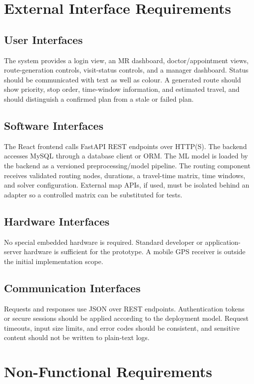 \documentclass[12pt,a4paper,oneside]{report}
\begin{document}
\section{External Interface Requirements}
\subsection{User Interfaces}
The system provides a login view, an MR dashboard, doctor/appointment views, route-generation controls, visit-status controls, and a manager dashboard. Status should be communicated with text as well as colour. A generated route should show priority, stop order, time-window information, and estimated travel, and should distinguish a confirmed plan from a stale or failed plan.

\subsection{Software Interfaces}
The React frontend calls FastAPI REST endpoints over HTTP(S). The backend accesses MySQL through a database client or ORM. The ML model is loaded by the backend as a versioned preprocessing/model pipeline. The routing component receives validated routing nodes, durations, a travel-time matrix, time windows, and solver configuration. External map APIs, if used, must be isolated behind an adapter so a controlled matrix can be substituted for tests.

\subsection{Hardware Interfaces}
No special embedded hardware is required. Standard developer or application-server hardware is sufficient for the prototype. A mobile GPS receiver is outside the initial implementation scope.

\subsection{Communication Interfaces}
Requests and responses use JSON over REST endpoints. Authentication tokens or secure sessions should be applied according to the deployment model. Request timeouts, input size limits, and error codes should be consistent, and sensitive content should not be written to plain-text logs.

\section{Non-Functional Requirements}
\end{document}
